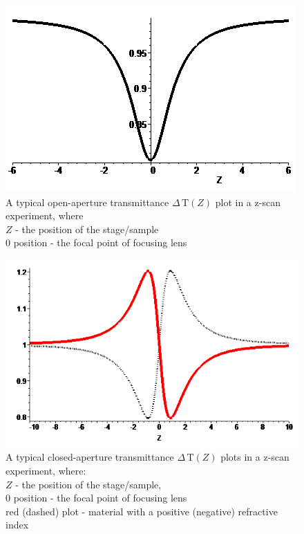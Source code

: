 \documentclass[12pt,twoside,a4paper]{article}
\numberwithin{equation}{subsection}
\numberwithin{figure}{subsection}
\begin{document}
\begin{figure}
  \includegraphics{img/oa_plot.png}
  \caption{A typical open-aperture transmittance $\Delta \,\mathrm{T}(Z)$ plot in a z-scan experiment, where \\ 
  $Z$ - the position of the stage/sample \\ 
  $0$ position - the focal point of focusing lens 
  \label{fig:oa_plot}}
\end{figure}


\begin{figure}
  \includegraphics{img/ca_plot.png}
  \caption{A typical closed-aperture transmittance $\Delta \,\mathrm{T}(Z)$ plots in a z-scan experiment, where: \\  
    $Z$ - the position of the stage/sample, \\
    $0$ position - the focal point of focusing lens \\
    red (dashed) plot - material with a positive (negative) refractive index
    \label{fig:ca_plot}}
\end{figure}
\end{document}
